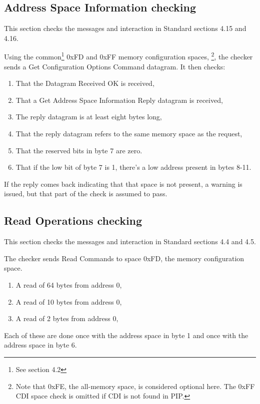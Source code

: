 \subsection{Address Space Information checking}

This section checks the messages and interaction in Standard sections 4.15 and 4.16.

Using the common\footnote{See section 4.2}
0xFD and 0xFF memory configuration spaces,
\footnote{Note that 0xFE, the all-memory space, is considered optional here. The 0xFF CDI 
space check is omitted if CDI is not found in PIP.}, 
the checker sends a Get Configuration Options Command datagram.  It then checks:
\begin{enumerate}
\item That the Datagram Received OK is received,
\item That a Get Address Space Information Reply datagram is received,
\item The reply datagram is at least eight bytes long,
\item That the reply datagram refers to the same memory space as the request,
\item That the reserved bits in byte 7 are zero.
\item That if the low bit of byte 7 is 1, there's a low address present in bytes 8-11.
\end{enumerate}

If the reply comes back indicating that that space is not present, 
a warning is issued, but that part of the check is assumed to pass.

\subsection{Read Operations checking}

This section checks the messages and interaction in Standard sections 4.4 and 4.5.

The checker sends Read Commands to space 0xFD, the memory configuration space.

\begin{enumerate}
\item A read of 64 bytes from address 0,
\item A read of 10 bytes from address 0,
\item A read of 2 bytes from address 0,
\end{enumerate}

Each of these are done once with the address space in byte 1 
and once with the address space in byte 6.


